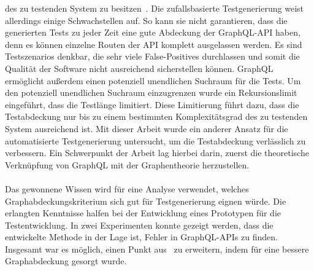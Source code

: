 des zu testenden System zu besitzen~\cite[vgl. Proposed Method]{property-based-testing}.
Die zufallsbasierte Testgenerierung weist allerdings einige Schwachstellen auf.
So kann sie nicht garantieren, dass die generierten Tests zu jeder Zeit eine gute Abdeckung der GraphQL-API haben, denn es können einzelne Routen der API
komplett ausgelassen werden.
Es sind Testszenarios denkbar, die sehr viele False-Positives durchlassen und somit die Qualität der Software nicht ausreichend sicherstellen können.
GraphQL ermöglicht außerdem einen potenziell unendlichen Suchraum für die Tests.
Um den potenziell unendlichen Suchraum einzugrenzen wurde ein Rekursionslimit eingeführt, dass die Testlänge limitiert.
Diese Limitierung führt dazu, dass die Testabdeckung nur bis zu einem bestimmten Komplexitätsgrad des zu testenden System ausreichend ist.
Mit dieser Arbeit wurde ein anderer Ansatz für die automatisierte Testgenerierung untersucht, um die Testabdeckung verlässlich zu verbessern.
Ein Schwerpunkt der Arbeit lag hierbei darin, zuerst die theoretische Verknüpfung von GraphQL mit der Graphentheorie herzustellen.
\\
\\
Das gewonnene Wissen wird für eine Analyse verwendet, welches Graphabdeckungskriterium sich gut für Testgenerierung eignen würde.
Die erlangten Kenntnisse halfen bei der Entwicklung eines Prototypen für die Testentwicklung.
In zwei Experimenten konnte gezeigt werden, dass die entwickelte Methode in der Lage ist, Fehler in GraphQL-APIs zu finden.
Insgesamt war es möglich, einen Punkt aus~\cite[VI. Future Work]{property-based-testing} zu erweitern, indem für eine bessere Graphabdeckung gesorgt wurde.
